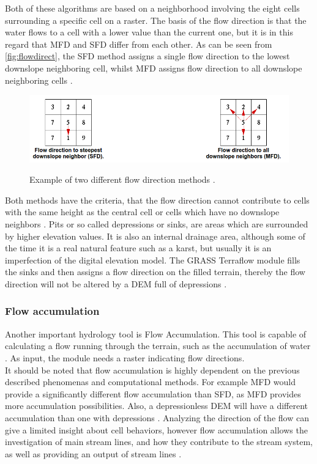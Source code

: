 Both of these algorithms are based on a neighborhood involving the eight cells surrounding a specific cell on a raster. The basis of the flow direction is that the water flows to a cell with a lower value than the current one, but it is in this regard that MFD and SFD differ from each other. As can be seen from \autoref{fig:flowdirect}, the SFD method assigns a single flow direction to the lowest downslope neighboring cell, whilst MFD assigns flow direction to all downslope neighboring cells \citep{grassbook}. \\
\begin{figure}[t]
\centering
	{\includegraphics[width=\linewidth]{gfx/SFD_MFD.png}}
\caption{Example of two different flow direction methods \citep{sfdmfd}.}
\label{fig:flowdirect}
\end{figure}
Both methods have the criteria, that the flow direction cannot contribute to cells with the same height as the central cell or cells which have no downslope neighbors \citep{sfdmfd2}.
Pits or so called depressions or sinks, are areas which are surrounded by higher elevation values. It is also an internal drainage area, although some of the time it is a real natural feature such as a karst, but usually it is an imperfection of the digital elevation model.  The GRASS Terraflow module fills the sinks and then assigns a flow direction on the filled terrain, thereby the flow direction will not be altered by a DEM full of depressions \citep{sfdmfd}. 

\subsubsection{Flow accumulation}
Another important hydrology tool is Flow Accumulation. This tool is capable of calculating a flow running through the terrain, such as the accumulation of water \citep{sfdmfd}. As input, the module needs a raster indicating flow directions. \\ 
It should be noted that flow accumulation is highly dependent on the previous described phenomenas and computational methods. For example MFD would provide a significantly different flow accumulation than SFD, as MFD provides more accumulation possibilities. Also, a depressionless DEM will have a different accumulation than one with depressions \citep{sfdmfd}. Analyzing the direction of the flow can give a limited insight about cell behaviors, however flow accumulation allows the investigation of main stream lines, and how they contribute to the stream system, as well as providing an output of stream lines \citep{grassbook}.

